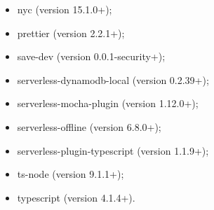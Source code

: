 \begin{enumerate}
\begin{itemize}
\item nyc (version 15.1.0+);
\item prettier (version 2.2.1+);
\item save-dev (version 0.0.1-security+);
\item serverless-dynamodb-local (version 0.2.39+);
\item serverless-mocha-plugin (version 1.12.0+);
\item serverless-offline (version 6.8.0+);
\item serverless-plugin-typescript (version 1.1.9+);
\item ts-node (version 9.1.1+);
\item typescript (version 4.1.4+).
\end{itemize}
\end{enumerate}
